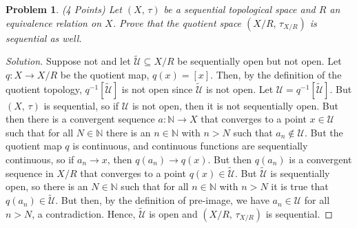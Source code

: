 \documentclass{article}
\theoremstyle{normal}
\newtheorem{problem}{Problem}
\begin{document}
    \clearpage
    \color{blue}
    \begin{problem}
        (4 Points) Let $(X,\,\tau)$ be a sequential topological space and $R$
        an equivalence relation on $X$. Prove that the quotient space
        $(X/R,\,\tau_{X/R})$ is sequential as well.
    \end{problem}
    \color{black}
    \begin{proof}[Solution]
        Suppose not and let $\tilde{\mathcal{U}}\subseteq{X/R}$ be sequentially
        open but not open. Let $q:X\rightarrow{X}/R$ be the quotient map,
        $q(x)=[x]$. Then, by the definition of the quotient topology,
        $q^{-1}[\tilde{\mathcal{U}}]$ is not open since $\tilde{\mathcal{U}}$
        is not open. Let $\mathcal{U}=q^{-1}[\tilde{\mathcal{U}}]$. But
        $(X,\,\tau)$ is sequential, so if $\mathcal{U}$ is not open, then it
        is not sequentially open. But then there is a convergent sequence
        $a:\mathbb{N}\rightarrow{X}$ that converges to a point $x\in\mathcal{U}$
        such that for all $N\in\mathbb{N}$ there is an $n\in\mathbb{N}$ with
        $n>N$ such that $a_{n}\notin\mathcal{U}$. But the quotient map
        $q$ is continuous, and continuous functions are sequentially continuous,
        so if $a_{n}\rightarrow{x}$, then $q(a_{n})\rightarrow{q}(x)$. But then
        $q(a_{n})$ is a convergent sequence in $X/R$ that converges to a
        point $q(x)\in\tilde{\mathcal{U}}$. But $\tilde{\mathcal{U}}$ is
        sequentially open, so there is an $N\in\mathbb{N}$ such that for all
        $n\in\mathbb{N}$ with $n>N$ it is true that
        $q(a_{n})\in\tilde{\mathcal{U}}$. But then, by the definition of
        pre-image, we have $a_{n}\in\mathcal{U}$ for all $n>N$, a contradiction.
        Hence, $\tilde{\mathcal{U}}$ is open and
        $(X/R,\,\tau_{X/R})$ is sequential.
    \end{proof}
    \clearpage
    \color{blue}
\end{document}
